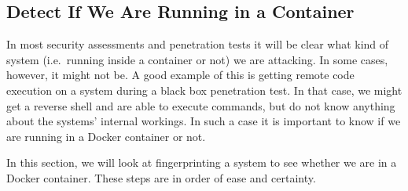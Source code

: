 \subsection{Detect If We Are Running in a Container}\label{subsection:detection}
In most security assessments and penetration tests it will be clear what kind of system (i.e.\ running inside a container or not) we are attacking. In some cases, however, it might not be. A good example of this is getting remote code execution on a system during a black box penetration test. In that case, we might get a reverse shell and are able to execute commands, but do not know anything about the systems' internal workings. In such a case it is important to know if we are running in a Docker container or not.

\medskip

In this section, we will look at fingerprinting a system to see whether we are in a Docker container. These steps are in order of ease and certainty.





